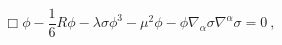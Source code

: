 \begin{equation}
\Box \phi-\frac{1}{6}R \phi-\lambda \sigma \phi^3- \mu^2 \phi-\phi
\nabla_{\alpha }\sigma \nabla^{\alpha  }\sigma =0~,
\label{6-a}\end{equation} 
